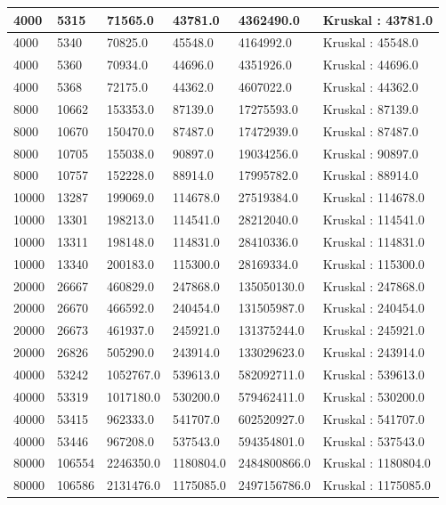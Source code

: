 \begin{longtable}[H]{|p{1.5cm}|p{1.5cm}|p{2cm}|p{2cm}|p{3cm}|p{3cm}|}
    4000 & 5315 & 71565.0 & 43781.0 & 4362490.0 & Kruskal : 43781.0 \\ \hline 
    4000 & 5340 & 70825.0 & 45548.0 & 4164992.0 & Kruskal : 45548.0 \\ \hline 
    4000 & 5360 & 70934.0 & 44696.0 & 4351926.0 & Kruskal : 44696.0 \\ \hline 
    4000 & 5368 & 72175.0 & 44362.0 & 4607022.0 & Kruskal : 44362.0 \\ \hline 
    8000 & 10662 & 153353.0 & 87139.0 & 17275593.0 & Kruskal : 87139.0 \\ \hline
    8000 & 10670 & 150470.0 & 87487.0 & 17472939.0 & Kruskal : 87487.0 \\ \hline
    8000 & 10705 & 155038.0 & 90897.0 & 19034256.0 & Kruskal : 90897.0 \\ \hline
    8000 & 10757 & 152228.0 & 88914.0 & 17995782.0 & Kruskal : 88914.0 \\ \hline
    10000 & 13287 & 199069.0 & 114678.0 & 27519384.0 & Kruskal : 114678.0 \\ \hline 
    10000 & 13301 & 198213.0 & 114541.0 & 28212040.0 & Kruskal : 114541.0 \\ \hline 
    10000 & 13311 & 198148.0 & 114831.0 & 28410336.0 & Kruskal : 114831.0 \\ \hline 
    10000 & 13340 & 200183.0 & 115300.0 & 28169334.0 & Kruskal : 115300.0 \\ \hline 
    20000 & 26667 & 460829.0 & 247868.0 & 135050130.0 & Kruskal : 247868.0 \\ \hline
    20000 & 26670 & 466592.0 & 240454.0 & 131505987.0 & Kruskal : 240454.0 \\ \hline
    20000 & 26673 & 461937.0 & 245921.0 & 131375244.0 & Kruskal : 245921.0 \\ \hline
    20000 & 26826 & 505290.0 & 243914.0 & 133029623.0 & Kruskal : 243914.0 \\ \hline
    40000 & 53242 & 1052767.0 & 539613.0 & 582092711.0 & Kruskal : 539613.0 \\ \hline 
    40000 & 53319 & 1017180.0 & 530200.0 & 579462411.0 & Kruskal : 530200.0 \\ \hline 
    40000 & 53415 & 962333.0 & 541707.0 & 602520927.0 & Kruskal : 541707.0 \\ \hline 
    40000 & 53446 & 967208.0 & 537543.0 & 594354801.0 & Kruskal : 537543.0 \\ \hline 
    80000 & 106554 & 2246350.0 & 1180804.0 & 2484800866.0 & Kruskal : 1180804.0 \\ \hline
    80000 & 106586 & 2131476.0 & 1175085.0 & 2497156786.0 & Kruskal : 1175085.0 \\ \hline

\end{longtable}
